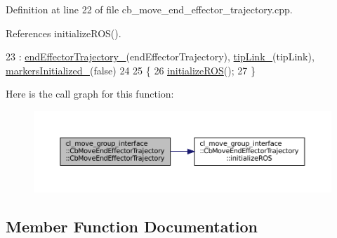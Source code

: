 Definition at line 22 of file cb\+\_\+move\+\_\+end\+\_\+effector\+\_\+trajectory.\+cpp.



References initialize\+R\+O\+S().


\begin{DoxyCode}
23         : \hyperlink{classcl__move__group__interface_1_1CbMoveEndEffectorTrajectory_ae13dfd31ea3660646e03882f0c2c29f0}{endEffectorTrajectory\_}(endEffectorTrajectory), 
      \hyperlink{classcl__move__group__interface_1_1CbMoveEndEffectorTrajectory_a24c6c30b9b0761a61fa002d947bd3e11}{tipLink\_}(tipLink), \hyperlink{classcl__move__group__interface_1_1CbMoveEndEffectorTrajectory_ac140a7f0adfb20f1e2900a5c8cd2ca5b}{markersInitialized\_}(\textcolor{keyword}{false})
24 
25     \{
26         \hyperlink{classcl__move__group__interface_1_1CbMoveEndEffectorTrajectory_afcee8f3853a5cef8806137a304c8a14b}{initializeROS}();
27     \}
\end{DoxyCode}
Here is the call graph for this function\+:
\nopagebreak
\begin{figure}[H]
\begin{center}
\leavevmode
\includegraphics[width=350pt]{classcl__move__group__interface_1_1CbMoveEndEffectorTrajectory_ae6985de3f8f0e1ec7dea88c1e551889a_cgraph}
\end{center}
\end{figure}


\subsection{Member Function Documentation}
\mbox{\label{classcl__move__group__interface_1_1CbMoveEndEffectorTrajectory_a485057c052729edd3e8303440b7ada66}} 
